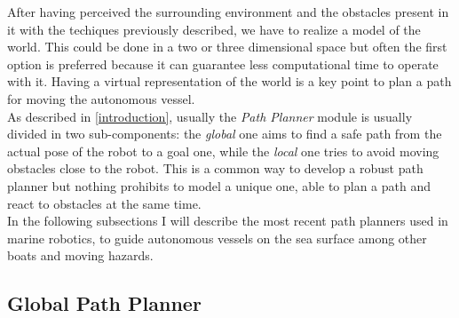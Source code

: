 \documentclass[journal]{IEEEtran}
\begin{document}
      After having perceived the surrounding environment and the obstacles present in it with the techiques previously described, we have to realize a model of the world. This could be done in a two or three dimensional space but often the first option is preferred because it can guarantee less computational time to operate with it. Having a virtual representation of the world is a key point to plan a path for moving the autonomous vessel.\\
      As described in \ref{introduction}, usually the \textit{Path Planner} module is usually divided in two sub-components: the \textit{global} one aims to find a safe path from the actual pose of the robot to a goal one, while the \textit{local} one tries to avoid moving obstacles close to the robot. This is a common way to develop a robust path planner but nothing prohibits  to model a unique one, able to plan a path and react to obstacles at the same time.\\
      \indent In the following subsections I will describe the most recent path planners used in marine robotics, to guide autonomous vessels on the sea surface among other boats and moving hazards.

        \subsection{Global Path Planner} \label{gpp}
\end{document}
